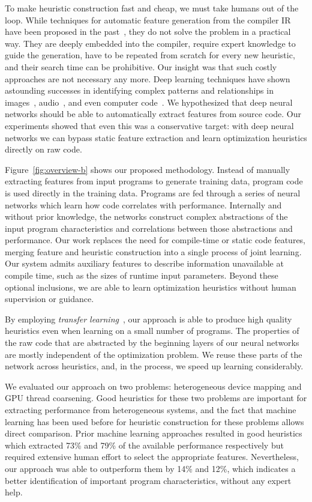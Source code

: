 To make heuristic construction fast and cheap, we must take humans out of the
loop. While techniques for automatic feature generation from the compiler IR
have been proposed in the past~\cite{Namolaru2010a,Leather2014}, they do not
solve the problem in a practical way. They are deeply embedded into the
compiler, require expert knowledge to guide the generation, have to be repeated
from scratch for every new heuristic, and their search time can be prohibitive.
Our insight was that such costly approaches are not necessary any more. Deep
learning techniques have shown astounding successes in identifying complex
patterns and relationships in images~\cite{Krizhevsky2012,He2016},
audio~\cite{Lee2009b}, and even computer
code~\cite{Allamanis2014,Allamanis2014a,Cummins2017a}. We hypothesized that deep
neural networks should be able to automatically extract features from source
code. Our experiments showed that even this was a conservative target: with deep
neural networks we can bypass static feature extraction and learn optimization
heuristics directly on raw code.

Figure~\ref{fig:overview-b} shows our proposed methodology. Instead of manually
extracting features from input programs to generate training data, program code
is used directly in the training data. Programs are fed through a series of
neural networks which learn how code correlates with performance. Internally and
without prior knowledge, the networks construct complex abstractions of the
input program characteristics and correlations between those abstractions and
performance. Our work replaces the need for compile-time or static code
features, merging feature and heuristic construction into a single process of
joint learning. Our system admits auxiliary features to describe information
unavailable at compile time, such as the sizes of runtime input parameters.
Beyond these optional inclusions, we are able to learn optimization heuristics
without human supervision or guidance.

By employing \emph{transfer learning}~\cite{Yosinski2014}, our approach is able
to produce high quality heuristics even when learning on a small number of
programs. The properties of the raw code that are abstracted by the beginning
layers of our neural networks are mostly independent of the optimization
problem. We reuse these parts of the network across heuristics, and, in the
process, we speed up learning considerably.

We evaluated our approach on two problems: heterogeneous device mapping and GPU
thread coarsening. Good heuristics for these two problems are important for
extracting performance from heterogeneous systems, and the fact that machine
learning has been used before for heuristic construction for these problems
allows direct comparison. Prior machine learning approaches resulted in good
heuristics which extracted 73\% and 79\% of the available performance
respectively but required extensive human effort to select the appropriate
features. Nevertheless, our approach was able to outperform them by 14\% and
12\%, which indicates a better identification of important program
characteristics, without any expert help.

